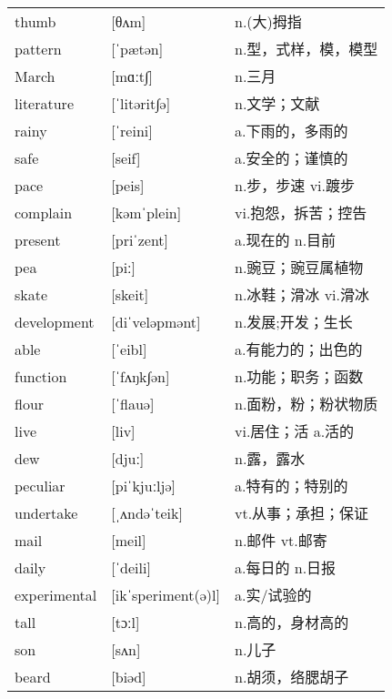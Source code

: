 \documentclass[a4paper]{article}
\begin{document}
\section{}
\begin{tabular}{l l l}

thumb & [θʌm] & n.(大)拇指 \\
pattern & [ˈpætən] & n.型，式样，模，模型 \\
March & [mɑːt∫] & n.三月 \\
literature & [ˈlitərit∫ə] & n.文学；文献 \\
rainy & [ˈreini] & a.下雨的，多雨的 \\
safe & [seif] & a.安全的；谨慎的 \\
pace & [peis] & n.步，步速 vi.踱步 \\
complain & [kəmˈplein] & vi.抱怨，拆苦；控告 \\
present & [priˈzent] & a.现在的 n.目前 \\
pea & [piː] & n.豌豆；豌豆属植物 \\
skate & [skeit] & n.冰鞋；滑冰 vi.滑冰 \\
development & [diˈveləpmənt] & n.发展;开发；生长 \\
able & [ˈeibl] & a.有能力的；出色的 \\
function & [ˈfʌŋk∫ən] & n.功能；职务；函数 \\
flour & [ˈflauə] & n.面粉，粉；粉状物质 \\
live & [liv] & vi.居住；活 a.活的 \\
dew & [djuː] & n.露，露水 \\
peculiar & [piˈkjuːljə] & a.特有的；特别的 \\
undertake & [ˌʌndəˈteik] & vt.从事；承担；保证 \\
mail & [meil] & n.邮件 vt.邮寄 \\
daily & [ˈdeili] & a.每日的 n.日报 \\
experimental & [ikˈsperiment(ə)l] & a.实/试验的 \\
tall & [tɔːl] & n.高的，身材高的 \\
son & [sʌn] & n.儿子 \\
beard & [biəd] & n.胡须，络腮胡子 \\

\end{tabular}
\end{document}

